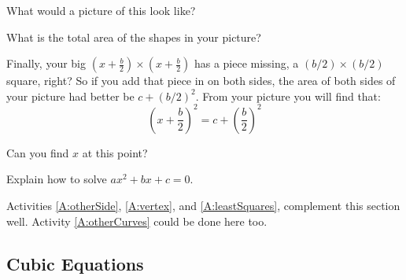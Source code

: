 
\begin{question} What would a picture of this look like?
\end{question}
\QM

\begin{question} What is the total area of the shapes in your picture?
\end{question}
\QM

Finally, your big $(x + \frac{b}{2}) \times (x + \frac{b}{2})$ has a
piece missing, a $(b/2) \times (b/2)$ square, right? So if you add
that piece in on both sides, the area of both sides of your picture
had better be $c + (b/2)^2$. From your picture you will find that:
\[
\left(x + \frac{b}{2}\right)^2 = c + \left(\frac{b}{2}\right)^2
\]

\begin{question} 
Can you find $x$ at this point?
\end{question}
\QM

\begin{question}
Explain how to solve $ax^2 + bx + c = 0$.
\end{question}
\QM




\begin{activitynote}
Activities \ref{A:otherSide}, \ref{A:vertex}, and \ref{A:leastSquares},
complement this section well.
Activity \ref{A:otherCurves} could be done here too.  %
\end{activitynote}

\begin{activitynote}
\end{activitynote}

\subsection{Cubic Equations}

